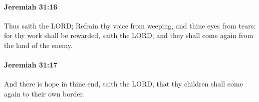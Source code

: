 		\paragraph{Jeremiah 31:16} %
			\label{JEREMIAH-31-16}

			Thus saith the LORD; Refrain thy voice from weeping, and thine eyes from tears: for thy work shall be rewarded, saith the LORD; and they shall come again from the land of the enemy.


		\paragraph{Jeremiah 31:17} %
			\label{JEREMIAH-31-17}

			And there is hope in thine end, saith the LORD, that thy children shall come again to their own border.


